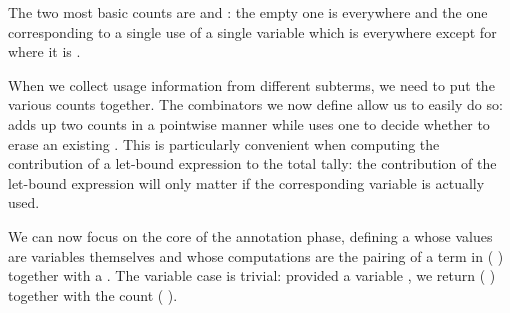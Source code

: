 \noindent
\begin{minipage}{\textwidth}
  \begin{minipage}{0.45\textwidth}
  \end{minipage}
  \begin{minipage}{0.45\textwidth}
  \end{minipage}
\end{minipage}

The two most basic counts are  and : the
empty one is  everywhere and the one corresponding to a single use
of a single variable  which is  everywhere except for 
where it is .

\noindent
\begin{minipage}{\textwidth}
  \begin{minipage}{0.45\textwidth}
  \end{minipage}
  \begin{minipage}{0.45\textwidth}
  \end{minipage}
\end{minipage}

When we collect usage information from different subterms, we need to put the
various counts together. The combinators we now define
allow us to easily do so:  adds up two counts in a pointwise manner
while  uses one  to decide whether to erase an existing
. This is particularly convenient when computing the contribution of
a let-bound expression to the total tally: the contribution of the let-bound
expression will only matter if the corresponding variable is actually used.

\noindent
\begin{minipage}{\textwidth}
  \begin{minipage}{0.5\textwidth}
  \end{minipage}
  \begin{minipage}{0.49\textwidth}
  \end{minipage}
\end{minipage}

We can now focus on the core of the annotation phase, defining a
 whose values are variables themselves and whose computations
are the pairing of a term in {(  )} together with
a . The variable case is trivial: provided a variable ,
we return {( )} together with the count {( )}.

